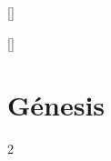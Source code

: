 
\titleformat{\section}[hang]{\bfseries\huge}{}{0ex}{}[]

\titleformat{\section}[wrap]{\bfseries\huge}{}{0ex}{}[]
\newpage

\tableofcontents
\newpage


\pagestyle{bible}

\renewcommand{\cleardoublepage}{\clearpage}

\chapter{Génesis}
\begin{multicols}{2}
  \raggedcolumns
  \parskip=0pt \relax
  
\end{multicols}





















